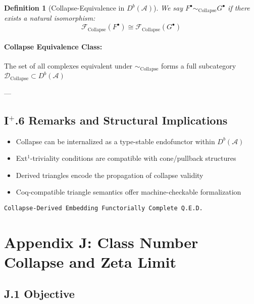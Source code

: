 \documentclass[11pt]{article}
\newtheorem{definition}[theorem]{Definition}
\begin{document}
\begin{definition}[Collapse-Equivalence in \( D^b(\mathcal{A}) \)]
We say \( F^\bullet \sim_{\mathrm{Collapse}} G^\bullet \) if there exists  
a natural isomorphism:
\[
\mathcal{F}_{\mathrm{Collapse}}(F^\bullet) \cong \mathcal{F}_{\mathrm{Collapse}}(G^\bullet)
\]
\end{definition}

\paragraph{Collapse Equivalence Class:}  
The set of all complexes equivalent under \( \sim_{\mathrm{Collapse}} \) forms  
a full subcategory \( \mathcal{D}_{\mathrm{Collapse}} \subset D^b(\mathcal{A}) \)

---

\subsection*{I$^{+}$.6 Remarks and Structural Implications}

\begin{itemize}
  \item Collapse can be internalized as a type-stable endofunctor within \( D^b(\mathcal{A}) \)
  \item Ext$^1$-triviality conditions are compatible with cone/pullback structures
  \item Derived triangles encode the propagation of collapse validity
  \item Coq-compatible triangle semantics offer machine-checkable formalization
\end{itemize}

\begin{flushright}
\texttt{Collapse-Derived Embedding \quad Functorially Complete \quad Q.E.D.}
\end{flushright}




\section*{Appendix J: Class Number Collapse and Zeta Limit}

\subsection*{J.1 Objective}
\end{document}
